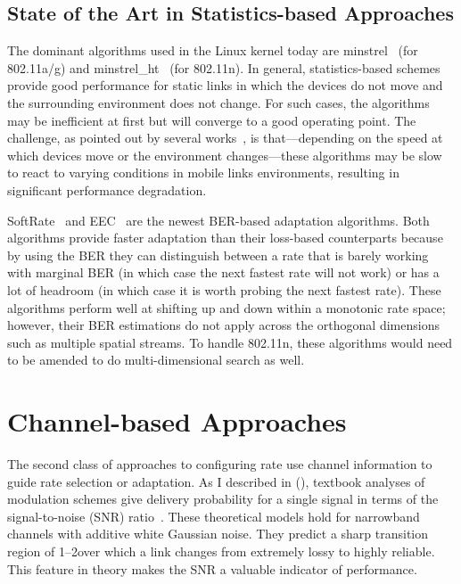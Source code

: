 \subsection{State of the Art in Statistics-based Approaches}
The dominant algorithms used in the Linux kernel today are minstrel~\cite{minstrel} (for 802.11a/g) and minstrel\_ht~\cite{minstrel_ht} (for 802.11n).  In general, statistics-based schemes provide good performance for static links in which the devices do not move and the surrounding environment does not change. For such cases, the algorithms may be inefficient at first but will converge to a good operating point. The challenge, as pointed out by several works~\cite{Holland_RBAR,Judd_CHARM,Vutukuru_SoftRate}, is that---depending on the speed at which devices move or the environment changes---these algorithms may be slow to react to varying conditions in mobile links environments, resulting in significant performance degradation.

SoftRate~\cite{Vutukuru_SoftRate} and EEC~\cite{Chen_EEC} are the newest BER-based adaptation algorithms. Both algorithms provide faster adaptation than their loss-based counterparts because by using the BER they can distinguish between a rate that is barely working with marginal BER (in which case the next fastest rate will not work) or has a lot of headroom (in which case it is worth probing the next fastest rate). These algorithms perform well at shifting up and down within a monotonic rate space; however, their BER estimations do not apply across the orthogonal dimensions such as multiple spatial streams. To handle 802.11n, these algorithms would need to be amended to do multi-dimensional search as well.

\section{Channel-based Approaches}
The second class of approaches to configuring rate use channel information to guide rate selection or adaptation.
As I described in  (), textbook analyses of modulation schemes give delivery probability for a single signal in terms of the signal-to-noise (SNR) ratio~\cite{Goldsmith}.
These theoretical models hold for narrowband channels with additive white Gaussian noise. They predict a sharp transition region of 1--2\dB over which a link changes from extremely lossy to highly reliable. This feature in theory makes the SNR a valuable indicator of performance.

